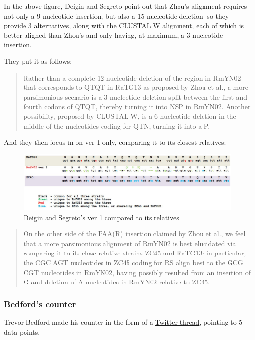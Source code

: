 \documentclass[11pt]{article}
\begin{document}
\begin{enumerate}
\begin{enumerate}
In the above figure, Deigin and Segreto point out that Zhou's alignment requires not only a 9 nucleotide insertion, but also a 15 nucleotide deletion, so they provide 3 alternatives, along with the CLUSTAL W alignment, each of which is better aligned than Zhou's and only having, at maximum, a 3 nucleotide insertion.

They put it as follows:
\begin{quote}
Rather than a complete 12-nucleotide deletion of the region in RmYN02 that corresponds to QTQT in RaTG13 as proposed by Zhou et al., a more parsimonious scenario is a 3-nucleotide deletion split between the first and fourth codons of QTQT, thereby turning it into NSP in RmYN02. Another possibility, proposed by CLUSTAL W, is a 6-nucleotide deletion in the middle of the nucleotides coding for QTN, turning it into a P.
\end{quote}

And they then focus in on ver 1 only, comparing it to its closest relatives:
\begin{figure}[htbp]
\centering
\includegraphics[width=.9\linewidth]{./images/ver-1-only.png}
\caption{Deigin and Segreto's ver 1 compared to its relatives}
\end{figure}
\begin{quote}
On the other side of the PAA(R) insertion claimed by Zhou et al., we feel that a more parsimonious alignment of RmYN02 is best elucidated via comparing it to its close relative strains ZC45 and RaTG13: in particular, the CGC AGT nucleotides in ZC45 coding for RS align best to the GCG CGT nucleotides in RmYN02, having possibly resulted from an insertion of G and deletion of A nucleotides in RmYN02 relative to ZC45.
\end{quote}
\end{enumerate}
\end{enumerate}

\subsubsection{Bedford's counter}
\label{sec:org1e58a16}
Trevor Bedford made his counter in the form of a \href{https://archive.is/5VE0w}{Twitter thread}, pointing to 5 data points.
\end{document}
